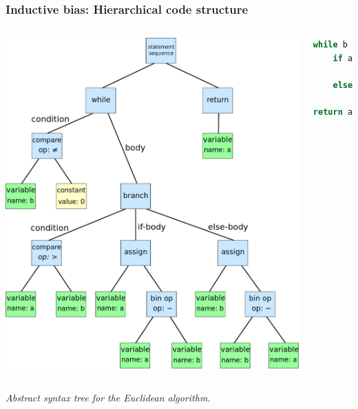 \documentclass[notheorems,10pt]{beamer}
\begin{document}
\begin{frame}[fragile]
	\frametitle{Inductive bias: Hierarchical code structure}

        \begin{columns}

        \begin{center}
            \includegraphics[height=0.7\textheight]{attachments/AST.png}
        \end{center}
        
        \begin{lstlisting}[language=Python]
while b != 0:
    if a > b:
        a = a - b
    else:
        b = b - a
return a
        \end{lstlisting}
        \end{columns}

    \vfill
    \vfill
    {\centering
    \textit{Abstract syntax tree for the Euclidean algorithm.}
    \par}
\end{frame}
\end{document}
